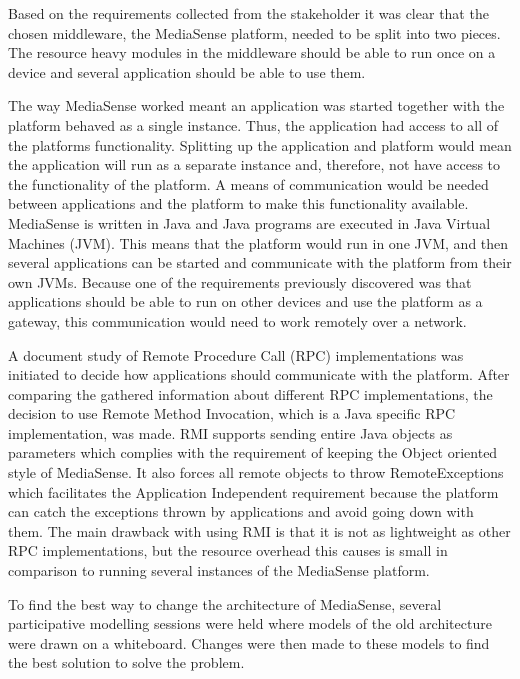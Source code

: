 Based on the requirements collected from the stakeholder it was clear that the chosen middleware, the MediaSense platform, needed to be split into two pieces. The resource heavy modules in the middleware should be able to run once on a device and several application should be able to use them. 

The way MediaSense worked meant an application was started together with the platform behaved as a single instance. Thus, the application had access to all of the platforms functionality. Splitting up the application and platform would mean the application will run as a separate instance and, therefore, not have access to the functionality of the platform. A means of communication would be needed between applications and the platform to make this functionality available. MediaSense is written in Java and Java programs are executed in Java Virtual Machines (JVM). This means that the platform would run in one JVM, and then several applications can be started and communicate with the platform from their own JVMs. Because one of the requirements previously discovered was that applications should be able to run on other devices and use the platform as a gateway, this communication would need to work remotely over a network.

A document study of Remote Procedure Call (RPC) implementations was initiated to decide how applications should communicate with the platform. After comparing the gathered information about different RPC implementations, the decision to use Remote Method Invocation, which is a Java specific RPC implementation, was made. RMI supports sending entire Java objects as parameters which complies with the requirement of keeping the Object oriented style of MediaSense. It also forces all remote objects to throw RemoteExceptions which facilitates the Application Independent requirement because the platform can catch the exceptions thrown by applications and avoid going down with them. The main drawback with using RMI is that it is not as lightweight as other RPC implementations, but the resource overhead this causes is small in comparison to running several instances of the MediaSense platform.

To find the best way to change the architecture of MediaSense, several participative modelling sessions were held where models of the old architecture were drawn on a whiteboard. Changes were then made to these models to find the best solution to solve the problem.

